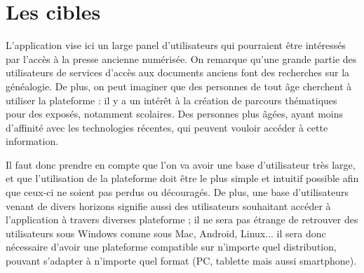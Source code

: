 \section{Les cibles}
\label{sec:cibles}
    L’application vise ici un large panel d’utilisateurs qui pourraient être intéressés
    par l’accès à la presse ancienne numérisée. On remarque qu’une grande partie
    des utilisateurs de services d’accès aux documents anciens font des recherches sur la généalogie.
    De plus, on peut imaginer que des personnes de tout âge cherchent à utiliser la plateforme :
    il y a un intérêt à la création de parcours thématiques pour des exposés, notamment scolaires.
    Des personnes plus âgées, ayant moins d’affinité avec les technologies récentes,
    qui peuvent vouloir accéder à cette information.

    Il faut donc prendre en compte que l’on va avoir une base d’utilisateur très large,
    et que l’utilisation de la plateforme doit être le plus simple et intuitif possible
    afin que ceux-ci ne soient pas perdus ou découragés. De plus, une base d’utilisateurs
    venant de divers horizons signifie aussi des utilisateurs souhaitant accéder à l’application
    à travers diverses plateforme ; il ne sera pas étrange de retrouver des utilisateurs
    sous Windows comme sous Mac, Android, Linux... il sera donc nécessaire d’avoir une plateforme
    compatible sur n’importe quel distribution, pouvant s’adapter à n’importe quel format (PC, tablette mais aussi smartphone).
